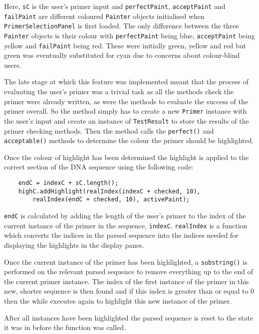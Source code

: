 Here, \texttt{sC} is the user's primer input and \texttt{perfectPaint},
\texttt{acceptPaint} and \texttt{failPaint} are different coloured
\texttt{Painter} objects initialised when \texttt{PrimerSelectionPanel}
is first loaded. The only difference between the three \texttt{Painter}
objects is their colour with \texttt{perfectPaint} being blue,
\texttt{acceptPaint} being yellow and \texttt{failPaint} being red.
These were initially green, yellow and red but green was eventually
substituted for cyan due to concerns about colour-blind users.

The late stage at which this feature was implemented meant that the
process of evaluating the user's primer was a trivial task as all the
methods check the primer were already written, as were the methods to
evaluate the success of the primer overall. So the method simply has to
create a new \texttt{Primer} instance with the user's input and create
an instance of \texttt{TestResult} to store the results of the primer
checking methods. Then the method calls the \texttt{perfect()} and
\texttt{acceptable()} methods to determine the colour the primer should
be highlighted.

Once the colour of highlight has been determined the highlight is
applied to the correct section of the DNA sequence using the following
code:

\begin{lstlisting}
    endC = indexC + sC.length();
    highC.addHighlight(realIndex(indexC + checked, 10),
        realIndex(endC + checked, 10), activePaint);
\end{lstlisting}

\texttt{endC} is calculated by adding the length of the user's primer to
the index of the current instance of the primer in the sequence, 
\texttt{indexC}. \texttt{realIndex} is a function which converts the
indices in the parsed sequence into the indices needed for displaying
the highlights in the display panes.

Once the current instance of the primer has been highlighted, a 
\texttt{substring()} is performed on the relevant parsed sequence to
remove everything up to the end of the current primer instance. The
index of the first instance of the primer in this new, shorter sequence
is then found and if this index is greater than or equal to 0 then the
while executes again to highlight this new instance of the primer.

After all instances have been highlighted the parsed sequence is reset
to the state it was in before the function was called.











